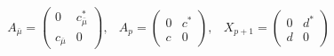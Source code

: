 \begin{equation}
\begin{array}{ccc}
A_{\bar{\mu}}= \left(
\begin{array}{cc}
0 & c_{\bar{\mu}}^{*} \\
c_{\bar{\mu}} & 0
\end{array}
\right)
, &
A_{p}= \left(
\begin{array}{cc}
0 & c^{*} \\
c & 0
\end{array}
\right)
, &
X_{p+1}= \left(
\begin{array}{cc}
0 & d^{*} \\
d & 0 
\end{array}
\right) 
\end{array}\label{ansatz}
\end{equation}


